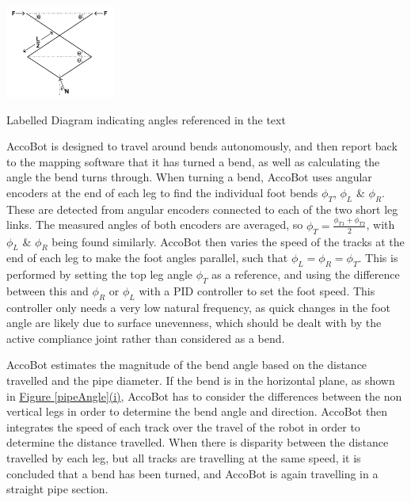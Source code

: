 \documentclass[11pt]{article}		%
\begin{document}
   			\begin{floatingfigure}[r]{0.3\textwidth}
   				\centering
   				\includegraphics[width = 0.27\textwidth]{legDiagram}
   				\caption{Labelled Diagram indicating angles referenced in the text}
   				\label{legDiagramRep}
   			\end{floatingfigure}
			AccoBot is designed to travel around bends autonomously, and then report back to the mapping software that it has turned a bend, as well as calculating the angle the bend turns through.
			When turning a bend, AccoBot uses angular encoders at the end of each leg to find the individual foot bends $\phi_T$, $\phi_L$ \& $\phi_R$.
			These are detected from angular encoders connected to each of the two short leg links.
			The measured angles of both encoders are averaged, so $\phi_T = \frac{\phi_{T1} + \phi_{T2}}{2}$, with $\phi_L$ \& $\phi_R$ being found similarly.
			AccoBot then varies the speed of the tracks at the end of each leg to make the foot angles parallel, such that $\phi_L = \phi_R = \phi_T$.
			This is performed by setting the top leg angle $\phi_T$ as a reference, and using the difference between this and $\phi_R$ or $\phi_L$ with a PID controller to set the foot speed.
			This controller only needs a very low natural frequency, as quick changes in the foot angle are likely due to surface unevenness, which should be dealt with by the active compliance joint rather than considered as a bend.
   			\begin{floatingfigure}[r]{0pt} \end{floatingfigure}
	        \hspace*{2ex}AccoBot estimates the magnitude of the bend angle based on the distance travelled and the pipe diameter.
			If the bend is in the horizontal plane, as shown in \hyperref[pipeAngle]{Figure \ref*{pipeAngle}(i)}, AccoBot has to consider the differences between the non vertical legs in order to determine the bend angle and direction.
			AccoBot then integrates the speed of each track over the travel of the robot in order to determine the distance travelled.
			When there is disparity between the distance travelled by each leg, but all tracks are travelling at the same speed, it is concluded that a bend has been turned, and AccoBot is again travelling in a straight pipe section.
\end{document}
